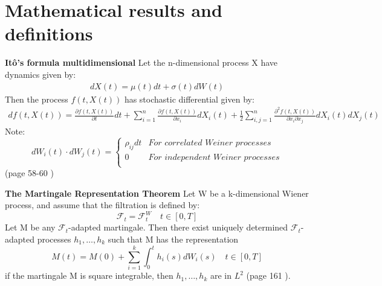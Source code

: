 
\chapter{Mathematical results and definitions} %

\label{AppendixA} %

\begin{theorem}\label{Ito}
\textbf{Itô's formula multidimensional} Let the n-dimensional process X have dynamics given by:
\begin{align}
dX(t)=\mu(t)dt+\sigma(t)dW(t)
\end{align}
Then the process $f(t,X(t))$ has stochastic differential given by:
\begin{equation}
\begin{split}
df(t,X(t))=\frac{\partial f(t,X(t))}{\partial t}  dt + \sum_{i=1}^{n} \frac{\partial f(t,X(t))}{\partial x_i}  dX_i(t) + \frac{1}{2} \sum_{i,j=1}^{n} \frac{\partial^2 f(t,X(t))}{\partial x_i \partial x_j}  dX_i(t)dX_j(t)  
\end{split}
\end{equation}
Note: \[ dW_i(t) \cdot dW_j(t)= \begin{cases} 
      \rho_{ij}dt & \textit{For correlated Weiner processes} \\
      0 & \textit{For independent Weiner processes} \\
   \end{cases}
\]
(page 58-60 \parencite{finKont})
\end{theorem}

\begin{theorem}\label{MRT}
\textbf{The Martingale Representation Theorem} 
Let W be a k-dimensional Wiener process, and assume that the filtration is defined by:
$$\mathcal{F}_t=\mathcal{F}_t^W \quad t\in [0,T]$$
Let M be any $\mathcal{F}_t$-adapted martingale. Then there exist uniquely determined $\mathcal{F}_t$-adapted processes $h_1, \ldots, h_k$ such that M has the representation
$$M(t)=M(0) + \sum_{i=1}^{k} \int_{0}^{t} h_i(s)dW_i(s) \quad t \in [0,T]$$
if the martingale M is square integrable, then $h_1, \ldots, h_k$ are in $L^2$ (page 161 \parencite{finKont}).
\end{theorem}

